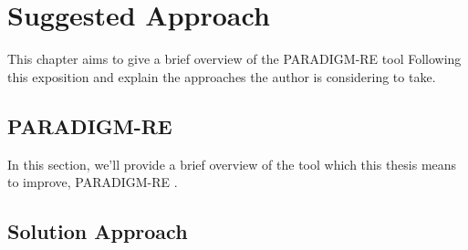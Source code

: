\chapter{Suggested Approach} \label{chap:approach}

This chapter aims to give a brief overview of the PARADIGM-RE tool Following this exposition and explain the approaches the author is considering to take.

\section{PARADIGM-RE} \label{sec:paradigmre}
In this section, we’ll provide a brief overview of the tool which this thesis means to improve, PARADIGM-RE \cite{nabuco2013inferring}.


\section{Solution Approach} \label{sec:solutionapproach}

